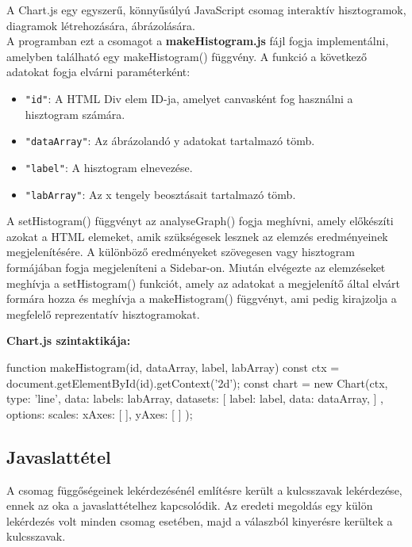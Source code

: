 A Chart.js egy egyszerű, könnyűsúlyú JavaScript csomag interaktív hisztogramok, diagramok létrehozására, ábrázolására.\\

A programban ezt a csomagot a \textbf{makeHistogram.js} fájl fogja implementálni, amelyben található egy makeHistogram() függvény. A funkció a következő adatokat fogja elvárni paraméterként: 

\begin{itemize}
	\item \texttt{"id"}: A HTML Div elem ID-ja, amelyet canvasként fog használni a hisztogram számára.
	\item \texttt{"dataArray"}: Az ábrázolandó y adatokat tartalmazó tömb.
	\item \texttt{"label"}: A hisztogram elnevezése.
	\item \texttt{"labArray"}: Az x tengely beosztásait tartalmazó tömb.
\end{itemize} 

A setHistogram() függvényt az analyseGraph() fogja meghívni, amely előkészíti azokat a HTML elemeket, amik szükségesek lesznek az elemzés eredményeinek megjelenítésére. A különböző eredményeket szövegesen vagy hisztogram formájában fogja megjeleníteni a Sidebar-on. Miután elvégezte az elemzéseket meghívja a setHistogram() funkciót, amely az adatokat a megjelenítő által elvárt formára hozza és meghívja a makeHistogram() függvényt, ami pedig kirajzolja a megfelelő reprezentatív hisztogramokat. 

\pagebreak
 
\noindent\textbf{Chart.js szintaktikája:}
 
\begin{js}
function makeHistogram(id, dataArray, label, labArray){
	const ctx = document.getElementById(id).getContext('2d');
	const chart = new Chart(ctx, {
		type: 'line',
		data: {
			labels: labArray,
			datasets: [{
				label: label,
				data: dataArray,
			}]
		},
		options: {
			scales: {
				xAxes: [{
				}],
				yAxes: [{
				}]
			}
		}
	});
}	
\end{js}

\subsection{Javaslattétel}

A csomag függőségeinek lekérdezésénél említésre került a kulcsszavak lekérdezése, ennek az oka a javaslattételhez kapcsolódik. Az eredeti megoldás egy külön lekérdezés volt minden csomag esetében, majd a válaszból kinyerésre kerültek a kulcsszavak. 


